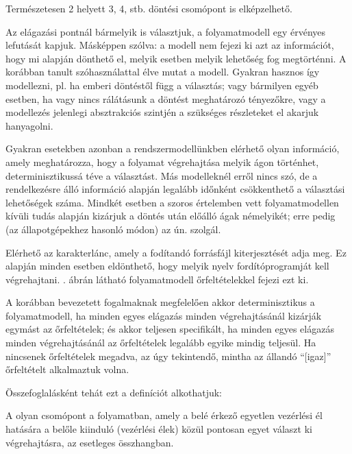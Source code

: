 Természetesen 2 helyett 3, 4, stb.  döntési csomópont is elképzelhető.

Az elágazási pontnál bármelyik  is választjuk, a folyamatmodell egy érvényes lefutását kapjuk. Másképpen szólva: a modell nem fejezi ki azt az információt, hogy mi alapján dönthető el, melyik esetben melyik lehetőség fog megtörténni. A korábban tanult szóhasználattal élve  mutat a modell. Gyakran hasznos így modellezni, pl. ha emberi döntéstől függ a választás; vagy bármilyen egyéb esetben, ha vagy nincs rálátásunk a döntést meghatározó tényezőkre, vagy a modellezés jelenlegi absztrakciós szintjén a szükséges részleteket el akarjuk hanyagolni. 

Gyakran esetekben azonban a rendszermodellünkben elérhető olyan információ, amely meghatározza, hogy a folyamat végrehajtása melyik ágon történhet, determinisztikussá téve a választást. Más modelleknél erről nincs szó, de a rendelkezésre álló információ alapján legalább időnként csökkenthető a választási lehetőségek száma. Mindkét esetben a szoros értelemben vett folyamatmodellen kívüli tudás alapján kizárjuk a döntés után előálló ágak némelyikét; erre pedig (az állapotgépekhez hasonló módon) az ún.  szolgál. 

\begin{pelda}
Elérhető az  karakterlánc, amely a fodítandó forrásfájl kiterjesztését adja meg. Ez alapján minden esetben eldönthető, hogy melyik nyelv fordítóprogramját kell végrehajtani. . ábrán látható folyamatmodell őrfeltételekkel fejezi ezt ki.
\end{pelda}


A korábban bevezetett fogalmaknak megfelelően akkor determinisztikus a folyamatmodell, ha minden egyes elágazás minden végrehajtásánál kizárják egymást az őrfeltételek; és akkor teljesen specifikált, ha minden egyes elágazás minden végrehajtásánál az őrfeltételek legalább egyike mindig teljesül. Ha nincsenek őrfeltételek megadva, az úgy tekintendő, mintha az állandó ``[igaz]'' őrfeltételt alkalmaztuk volna.

Összefoglalásként tehát ezt a definíciót alkothatjuk:
\begin{definicio}
	A  olyan csomópont a folyamatban, amely a belé érkező egyetlen vezérlési él hatására a belőle kiinduló  (vezérlési élek) közül pontosan egyet választ ki végrehajtásra, az esetleges  összhangban.
\end{definicio}


